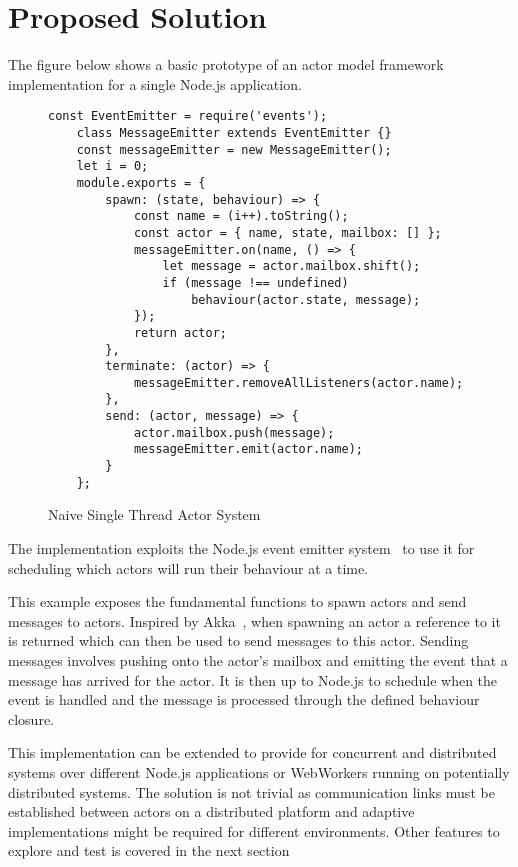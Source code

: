 \documentclass[12pt]{report}
\begin{document}
\section{Proposed Solution}
The figure below shows a basic prototype of an actor model framework implementation for a single Node.js application.
\begin{figure}[H]
  \begin{lstlisting}[gobble=2]
    const EventEmitter = require('events');
    class MessageEmitter extends EventEmitter {}
    const messageEmitter = new MessageEmitter();
    let i = 0;
    module.exports = {
        spawn: (state, behaviour) => {
            const name = (i++).toString();
            const actor = { name, state, mailbox: [] };
            messageEmitter.on(name, () => {
                let message = actor.mailbox.shift();
                if (message !== undefined)
                    behaviour(actor.state, message);
            });
            return actor;
        },
        terminate: (actor) => {
            messageEmitter.removeAllListeners(actor.name);
        },
        send: (actor, message) => {
            actor.mailbox.push(message);
            messageEmitter.emit(actor.name);
        }
    };
  \end{lstlisting}
  \caption{Naive Single Thread Actor System}
\end{figure}
The implementation exploits the Node.js event emitter system~\cite{nodeevents} to use it for scheduling which actors will run their behaviour at a time.

This example exposes the fundamental functions to spawn actors and send messages to actors. Inspired by Akka~\cite{stivan2015akka}, when spawning an actor a reference to it is returned which can then be used to send messages to this actor. Sending messages involves pushing onto the actor's mailbox and emitting the event that a message has arrived for the actor. It is then up to Node.js to schedule when the event is handled and the message is processed through the defined behaviour closure.

This implementation can be extended to provide for concurrent and distributed systems over different Node.js applications or WebWorkers running on potentially distributed systems. The solution is not trivial as communication links must be established between actors on a distributed platform and adaptive implementations might be required for different environments. Other features to explore and test is covered in the next section
\end{document}
